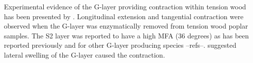 Experimental evidence of the G-layer providing contraction within tension wood
has been presented by \cite{Goswami_2008}. Longitudinal extension and tangential
contraction were observed when the G-layer was enzymatically removed from
tension wood poplar samples. The S2 layer was reported to have a high MFA (36
degrees) as has been reported previously and for other G-layer producing species
--refs--. \cite{Goswami_2008} suggested lateral swelling of the G-layer caused the
contraction.
